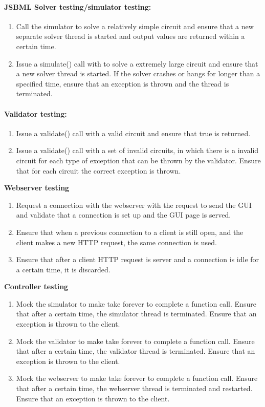 \paragraph{JSBML Solver testing/simulator testing:}
\begin{enumerate}
\item 
Call the simulator  to solve a relatively simple circuit and ensure that a new separate solver thread is started and output values are returned within a certain time.
\item Issue a simulate() call with  to solve a extremely large circuit and ensure that a new solver thread is started. If the solver crashes or hangs for longer than a specified time, ensure that an exception is thrown and the thread is terminated.
\end{enumerate}

\paragraph{Validator testing:}

\begin{enumerate}
\item Issue a validate() call with a valid circuit and ensure that true is returned.
\item Issue a validate() call with a set of invalid circuits, in which there is a invalid circuit for each type of exception that can be thrown by the validator. Ensure that for each circuit the correct exception is thrown. 
\end{enumerate}
\textbf{Webserver testing}
\begin{enumerate}
\item Request a connection with the webserver with the request to send the GUI and validate that a connection is set up and the GUI page is  served. 
\item Ensure that when a previous connection to a client is still open, and the client makes a new HTTP request, the same connection is used. 
\item Ensure that after a client HTTP request is server and a connection is idle for a certain time, it is discarded.\end{enumerate}
\textbf{Controller testing}
\begin{enumerate}
\item Mock the simulator to make take forever to complete a function call. Ensure that after a certain time, the  simulator thread is terminated. Ensure that an exception is thrown to the client.

\item Mock the validator to make take forever to complete a function call. Ensure that after a certain time, the  validator thread is terminated. Ensure that an exception is thrown to the client.

\item Mock the webserver to make take forever to complete a function call. Ensure that after a certain time, the  webserver thread is terminated and restarted. Ensure that an exception is thrown to the client.
\end{enumerate}

